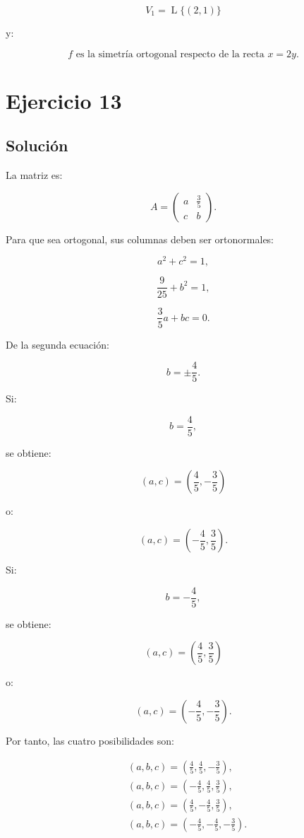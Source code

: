\documentclass[11pt,a4paper]{article}
\newcommand{\Span}{\operatorname{L}}
\begin{document}
\[
\boxed{
V_1=\Span\{(2,1)\}
}
\]

y:

\[
\boxed{
f\text{ es la simetría ortogonal respecto de la recta }x=2y.
}
\]

\section{Ejercicio 13}
\subsection{Solución}

La matriz es:

\[
A=
\begin{pmatrix}
a&\frac35\\[1mm]
c&b
\end{pmatrix}.
\]

Para que sea ortogonal, sus columnas deben ser ortonormales:

\[
a^2+c^2=1,
\]

\[
\frac9{25}+b^2=1,
\]

\[
\frac35a+bc=0.
\]

De la segunda ecuación:

\[
b=\pm\frac45.
\]

Si:

\[
b=\frac45,
\]

se obtiene:

\[
(a,c)
=
\left(
\frac45,-\frac35
\right)
\]

o:

\[
(a,c)
=
\left(
-\frac45,\frac35
\right).
\]

Si:

\[
b=-\frac45,
\]

se obtiene:

\[
(a,c)
=
\left(
\frac45,\frac35
\right)
\]

o:

\[
(a,c)
=
\left(
-\frac45,-\frac35
\right).
\]

Por tanto, las cuatro posibilidades son:

\[
\boxed{
\begin{aligned}
&(a,b,c)=
\left(
\frac45,\frac45,-\frac35
\right),\\
&(a,b,c)=
\left(
-\frac45,\frac45,\frac35
\right),\\
&(a,b,c)=
\left(
\frac45,-\frac45,\frac35
\right),\\
&(a,b,c)=
\left(
-\frac45,-\frac45,-\frac35
\right).
\end{aligned}
}
\]
\end{document}
